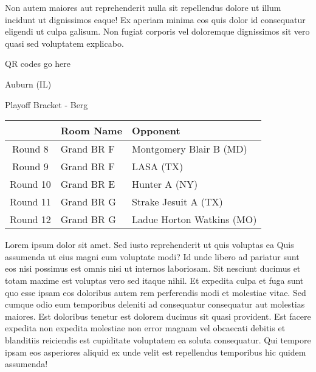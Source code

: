 \documentclass{article}%
\begin{document}
\newline%
Non autem maiores aut reprehenderit nulla sit repellendus dolore ut illum incidunt ut dignissimos eaque! Ex aperiam minima eos quis dolor id consequatur eligendi ut culpa galisum. Non fugiat corporis vel doloremque dignissimos sit vero quasi sed voluptatem explicabo.\newline%
\newline%
%
\vspace*{30pt}%
\begin{center}%
\begin{Huge}%
QR codes go here%
\end{Huge}%
\end{center}%
\newpage%
\begin{center}%
\begin{Huge}%
Auburn (IL)%
\end{Huge}%
\vspace*{8pt}%
\linebreak%
\begin{Large}%
Playoff Bracket {-} Berg%
\end{Large}%
\end{center}%
\begin{tabularx}{\textwidth}{|c|Y|Y|}%
\hline%
&Room Name&Opponent\\%
\hline%
Round 8&Grand BR F&Montgomery Blair B (MD)\\%
Round 9&Grand BR F&LASA (TX)\\%
Round 10&Grand BR E&Hunter A (NY)\\%
Round 11&Grand BR G&Strake Jesuit A (TX)\\%
Round 12&Grand BR G&Ladue Horton Watkins (MO)\\%
\hline%
\end{tabularx}%
\vspace*{8pt}%
\linebreak%
\newline%
\newline%
Lorem ipsum dolor sit amet. Sed iusto reprehenderit ut quis voluptas ea Quis assumenda ut eius magni eum voluptate modi? Id unde libero ad pariatur sunt eos nisi possimus est omnis nisi ut internos laboriosam. Sit nesciunt ducimus et totam maxime est voluptas vero sed itaque nihil. Et expedita culpa et fuga sunt quo esse ipsam eos doloribus autem rem perferendis modi et molestiae vitae.\newline%
\newline%
Sed cumque odio eum temporibus deleniti ad consequatur consequatur aut molestias maiores. Est doloribus tenetur est dolorem ducimus sit quasi provident. Est facere expedita non expedita molestiae non error magnam vel obcaecati debitis et blanditiis reiciendis est cupiditate voluptatem ea soluta consequatur. Qui tempore ipsam eos asperiores aliquid ex unde velit est repellendus temporibus hic quidem assumenda!\newline%
\end{document}
